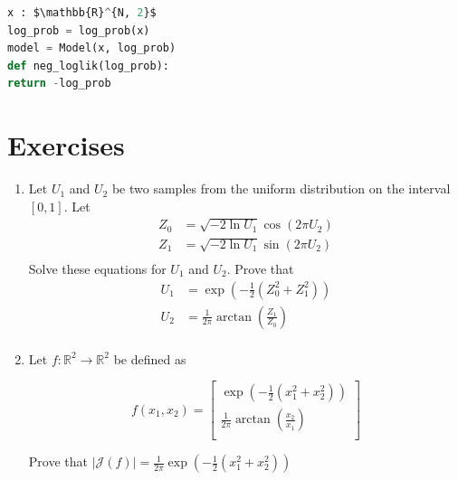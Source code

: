 \documentclass[book.tex]{subfiles}
\begin{document}
\begin{lstlisting}[language=python]
x : $\mathbb{R}^{N, 2}$
log_prob = log_prob(x)
model = Model(x, log_prob)
def neg_loglik(log_prob):
return -log_prob
\end{lstlisting}
\section*{Exercises}

\begin{enumerate}
    \item Let $U_1$ and $U_2$ be two samples from the uniform distribution on the interval $[0, 1]$. Let 
    \begin{eqnarray*}
Z_0 &= \sqrt{-2 \ln U_1} \cos(2\pi U_2) \\
Z_1 &= \sqrt{- 2 \ln U_1} \sin(2 \pi U_2) \\
\end{eqnarray*}
    Solve these equations for $U_1$ and $U_2$. Prove that 
    \begin{align*}
U_1 &= \exp\left(-\frac{1}{2}(Z_0^2 + Z_1^2) \right) \\
U_2 &= \frac{1}{2\pi} \arctan\left (\frac{Z_1}{Z_0}\right) \\
\end{align*}

\item Let $f:\mathbb{R}^2 \to \mathbb{R}^2$ be defined as

\[ f(x_1, x_2) = \begin{bmatrix}
    \exp\left(-\frac{1}{2}(x_1^2 + x_2^2) \right) \\
    \frac{1}{2\pi} \arctan\left (\frac{x_2}{x_1}\right) \\
    \end{bmatrix} \]
    
    Prove that $|\mathcal{J}(f)| = \frac{1}{2\pi}\exp(-\frac{1}{2} (x_1^2 + x_2^2))$
\end{enumerate}

\end{document}
